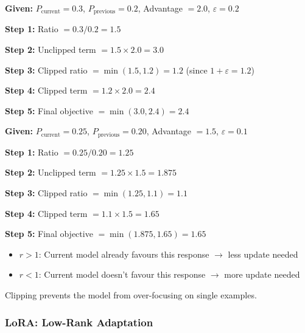 \begin{exbox}
\textbf{Given:} $P_{\text{current}} = 0.3$, $P_{\text{previous}} = 0.2$, Advantage $= 2.0$, $\varepsilon = 0.2$

\textbf{Step 1:} Ratio $= 0.3 / 0.2 = 1.5$

\textbf{Step 2:} Unclipped term $= 1.5 \times 2.0 = 3.0$

\textbf{Step 3:} Clipped ratio $= \min(1.5, 1.2) = 1.2$ (since $1+\varepsilon = 1.2$)

\textbf{Step 4:} Clipped term $= 1.2 \times 2.0 = 2.4$

\textbf{Step 5:} Final objective $= \min(3.0, 2.4) = \boxed{2.4}$
\end{exbox}

\begin{exbox}
\textbf{Given:} $P_{\text{current}} = 0.25$, $P_{\text{previous}} = 0.20$, Advantage $= 1.5$, $\varepsilon = 0.1$

\textbf{Step 1:} Ratio $= 0.25 / 0.20 = 1.25$

\textbf{Step 2:} Unclipped term $= 1.25 \times 1.5 = 1.875$

\textbf{Step 3:} Clipped ratio $= \min(1.25, 1.1) = 1.1$

\textbf{Step 4:} Clipped term $= 1.1 \times 1.5 = 1.65$

\textbf{Step 5:} Final objective $= \min(1.875, 1.65) = \boxed{1.65}$
\end{exbox}

\begin{tipbox}
\begin{itemize}
  \item $r > 1$: Current model already favours this response $\to$ less update needed
  \item $r < 1$: Current model doesn't favour this response $\to$ more update needed
\end{itemize}

Clipping prevents the model from over-focusing on single examples.
\end{tipbox}

\bigseparator

\subsubsection{LoRA: Low-Rank Adaptation}

